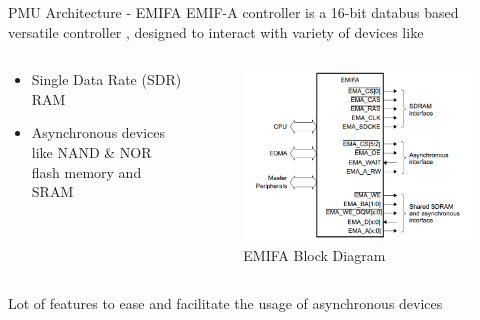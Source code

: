 \documentclass{beamer}
\begin{document}
\begin{frame}{PMU Architecture - EMIFA}
EMIF-A controller is a 16-bit databus based versatile controller \cite{uguide:emifa}, designed to interact with variety of devices like 
\begin{columns}
\begin{column}{0.5\textwidth}

	\begin{itemize}
	\item Single Data Rate (SDR) RAM
	\item Asynchronous devices like NAND \& NOR flash memory and SRAM
	\end{itemize}
	
	\end{column}

\begin{column}{0.5\textwidth}
	\begin{figure}
	\includegraphics[width=\columnwidth]{fig/EMIFA.png}
	\caption{EMIFA Block Diagram }
	\label{fig:EMIFA}
	\end{figure}
\end{column}
\end{columns}
Lot of features to ease and facilitate the usage of asynchronous devices
\end{frame}
\end{document}
